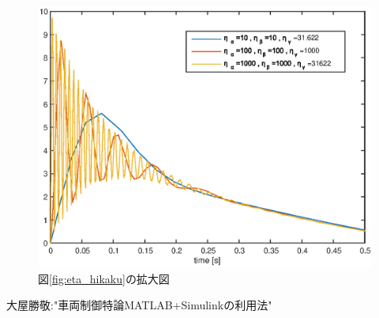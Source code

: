 \documentclass[a4paper,12pt]{jarticle}
\begin{document}
%
%
\begin{figure}[htb]
    \begin{center}
	 \includegraphics[width=140mm]{fig/eta_hikaku_k.eps}
        \caption{図\ref{fig:eta_hikaku}の拡大図}
        \label{fig:eta_hikaku_k}
    \end{center}
\end{figure}
%
%
%
%

\begin{thebibliography}{99}

  大屋勝敬:"車両制御特論MATLAB+Simulinkの利用法"
\end{thebibliography}
\end{document}

